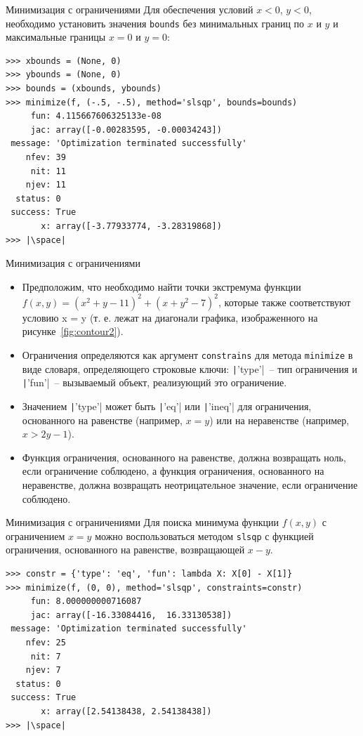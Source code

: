\documentclass[aspectratio=169, mathserif]{beamer}	%
\begin{document}
\begin{frame}[fragile]{Минимизация с ограничениями}
\scriptsize
Для обеспечения условий $x < 0$, $y < 0$, необходимо установить значения \texttt{bounds} без минимальных границ по $x$ и $y$ и максимальные границы $x = 0$ и $y = 0$:
\vfill
\begin{verbatim}
>>> xbounds = (None, 0)
>>> ybounds = (None, 0)
>>> bounds = (xbounds, ybounds)
>>> minimize(f, (-.5, -.5), method='slsqp', bounds=bounds)
     fun: 4.115667606325133e-08
     jac: array([-0.00283595, -0.00034243])
 message: 'Optimization terminated successfully'
    nfev: 39
     nit: 11
    njev: 11
  status: 0
 success: True
       x: array([-3.77933774, -3.28319868])
>>> |\space|
\end{verbatim}
\vfill
\end{frame}


\begin{frame}[fragile]{Минимизация с ограничениями}
\scriptsize
\begin{itemize}
\item Предположим, что необходимо найти точки экстремума функции $f\left(x, y\right) = \left(x^2 + y - 11\right)^2 + \left(x + y^2 - 7\right)^2$, которые также соответствуют условию x = y (т. е. лежат на диагонали графика, изображенного на рисунке~\ref{fig:contour2}).
\item Ограничения определяются как аргумент \texttt{constrains} для метода \texttt{minimize} в виде словаря, определяющего строковые ключи: \texttt|'type'|~-- тип ограничения и \texttt|'fun'|~-- вызываемый объект, реализующий это ограничение.
\item Значением \texttt|'type'| может быть \texttt|'eq'| или \texttt|'ineq'| для ограничения, основанного на равенстве (например, $x = y$) или на неравенстве (например, $x > 2y - 1$).
\item Функция ограничения, основанного на равенстве, должна возвращать ноль, если ограничение соблюдено, а функция ограничения, основанного на неравенстве, должна возвращать неотрицательное значение, если ограничение соблюдено.
\end{itemize}
\vfill
\end{frame}


\begin{frame}[fragile]{Минимизация с ограничениями}
\scriptsize
Для поиска минимума функции $f(x, y)$ с ограничением $x = y$ можно воспользоваться методом \texttt{slsqp} с функцией ограничения, основанного на равенстве, возвращающей $x - y$.
\vfill
\begin{verbatim}
>>> constr = {'type': 'eq', 'fun': lambda X: X[0] - X[1]}
>>> minimize(f, (0, 0), method='slsqp', constraints=constr)
     fun: 8.000000000716087
     jac: array([-16.33084416,  16.33130538])
 message: 'Optimization terminated successfully'
    nfev: 25
     nit: 7
    njev: 7
  status: 0
 success: True
       x: array([2.54138438, 2.54138438])
>>> |\space|
\end{verbatim}
\vfill
\end{frame}
\end{document}
